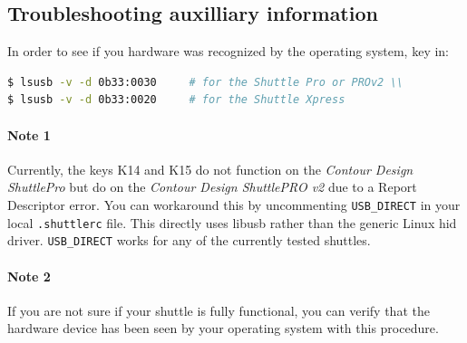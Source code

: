 \subsection{Troubleshooting auxilliary information}%
\label{sub:troubleshooting_auxilliary_information}

In order to see if you hardware was recognized by the operating system, key in:

\begin{lstlisting}[language=Bash,numbers=none]
$ lsusb -v -d 0b33:0030		# for the Shuttle Pro or PROv2 \\
$ lsusb -v -d 0b33:0020		# for the Shuttle Xpress
\end{lstlisting}


\paragraph{Note 1} Currently, the keys K14 and K15 do not function on the \textit{Contour Design ShuttlePro} but do on the   \textit{Contour Design ShuttlePRO v2} due to a Report Descriptor error.  You can workaround this by uncommenting \texttt{USB\_DIRECT} in your local \texttt{.shuttlerc} file.  This directly uses libusb rather than the generic Linux hid driver.  \texttt{USB\_DIRECT} works for any of the currently tested shuttles. 
    
\paragraph{Note 2} If you are not sure if your shuttle is fully functional, you can verify that the hardware device has been seen by your operating system with this procedure.



